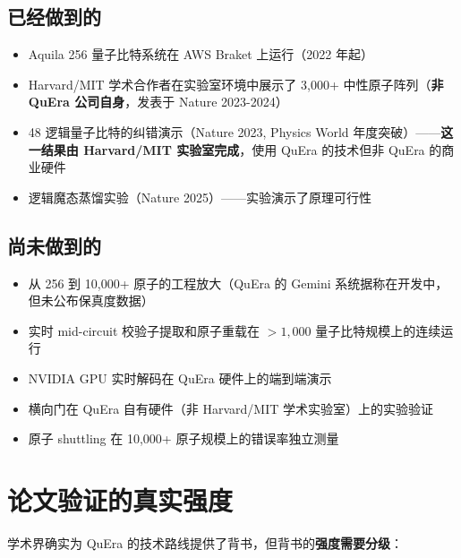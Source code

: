 \documentclass[11pt,a4paper]{ctexart}
\begin{document}
\subsection{已经做到的}

\begin{itemize}
\item Aquila 256 量子比特系统在 AWS Braket 上运行（2022 年起）
\item Harvard/MIT 学术合作者在实验室环境中展示了 3,000+ 中性原子阵列（\textbf{非 QuEra 公司自身}，发表于 Nature 2023-2024）
\item 48 逻辑量子比特的纠错演示（Nature 2023, Physics World 年度突破）——\textbf{这一结果由 Harvard/MIT 实验室完成}，使用 QuEra 的技术但非 QuEra 的商业硬件
\item 逻辑魔态蒸馏实验（Nature 2025）——实验演示了原理可行性
\end{itemize}

\subsection{尚未做到的}

\begin{itemize}
\item 从 256 到 10,000+ 原子的工程放大（QuEra 的 Gemini 系统据称在开发中，但未公布保真度数据）
\item 实时 mid-circuit 校验子提取和原子重载在 $>1,000$ 量子比特规模上的连续运行
\item NVIDIA GPU 实时解码在 QuEra 硬件上的端到端演示
\item 横向门在 QuEra 自有硬件（非 Harvard/MIT 学术实验室）上的实验验证
\item 原子 shuttling 在 10,000+ 原子规模上的错误率独立测量
\end{itemize}

\section{论文验证的真实强度}

学术界确实为 QuEra 的技术路线提供了背书，但背书的\textbf{强度需要分级}：
\end{document}
